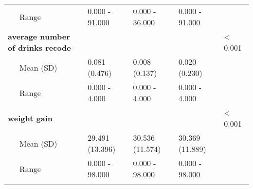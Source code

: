 \begin{longtable}[c]{@{}lllll@{}}
\\\addlinespace
~~~Range & 0.000 - 91.000 & 0.000 - 36.000 & 0.000 - 91.000 &
\\\addlinespace
\textbf{average number of drinks recode} & & & & \textless{} 0.001
\\\addlinespace
~~~Mean (SD) & 0.081 (0.476) & 0.008 (0.137) & 0.020 (0.230) &
\\\addlinespace
~~~Range & 0.000 - 4.000 & 0.000 - 4.000 & 0.000 - 4.000 &
\\\addlinespace
\textbf{weight gain} & & & & \textless{} 0.001
\\\addlinespace
~~~Mean (SD) & 29.491 (13.396) & 30.536 (11.574) & 30.369 (11.889) &
\\\addlinespace
~~~Range & 0.000 - 98.000 & 0.000 - 98.000 & 0.000 - 98.000 &
\\\addlinespace
\bottomrule
\end{longtable}
